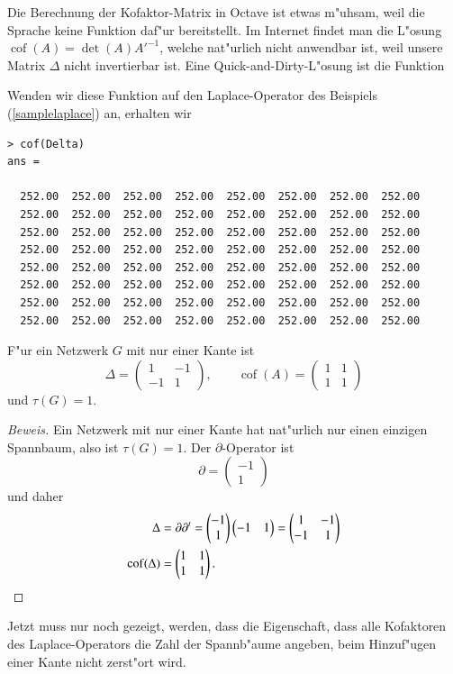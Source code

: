 \begin{beispiel}
Die Berechnung der Kofaktor-Matrix in Octave ist etwas m"uhsam, weil
die Sprache keine Funktion daf"ur bereitstellt.
Im Internet findet man die L"osung $\operatorname{cof}(A)=\det(A)A'^{-1}$,
welche nat"urlich nicht anwendbar ist, weil unsere Matrix $\Delta$
nicht invertierbar ist.
Eine Quick-and-Dirty-L"osung
ist die Funktion

Wenden wir diese Funktion auf den Laplace-Operator des Beispiels
(\ref{samplelaplace}) an, erhalten wir
{\small
\begin{verbatim}
> cof(Delta)
ans =

  252.00  252.00  252.00  252.00  252.00  252.00  252.00  252.00
  252.00  252.00  252.00  252.00  252.00  252.00  252.00  252.00
  252.00  252.00  252.00  252.00  252.00  252.00  252.00  252.00
  252.00  252.00  252.00  252.00  252.00  252.00  252.00  252.00
  252.00  252.00  252.00  252.00  252.00  252.00  252.00  252.00
  252.00  252.00  252.00  252.00  252.00  252.00  252.00  252.00
  252.00  252.00  252.00  252.00  252.00  252.00  252.00  252.00
  252.00  252.00  252.00  252.00  252.00  252.00  252.00  252.00
\end{verbatim}
}
\end{beispiel}

\begin{hilfssatz}
\label{matrixtreetheorem1}
F"ur ein Netzwerk $G$ mit nur einer Kante ist
\[
\Delta=\begin{pmatrix}
1&-1\\-1&1
\end{pmatrix},
\qquad
\operatorname{cof}(A)=\begin{pmatrix}1&1\\1&1\end{pmatrix}
\]
und
$\tau(G)=1$.
\end{hilfssatz}

\begin{proof}[Beweis]
Ein Netzwerk mit nur einer Kante hat nat"urlich nur einen einzigen
Spannbaum, also ist $\tau(G)=1$. Der $\partial$-Operator ist
\[
\partial=\begin{pmatrix}-1\\1\end{pmatrix}
\]
und daher
\begin{align*}
\Delta&=
\partial\partial^t=
\begin{pmatrix}-1\\1\end{pmatrix}
\begin{pmatrix}-1&1\end{pmatrix}
=
\begin{pmatrix}
1&-1\\
-1&1
\end{pmatrix}
\\
\operatorname{cof}(\Delta)&=\begin{pmatrix}1&1\\1&1\end{pmatrix}.
\qedhere
\end{align*}
\end{proof}
Jetzt muss nur noch gezeigt, werden, dass die Eigenschaft, dass alle
Kofaktoren des Laplace-Operators die Zahl der Spannb"aume angeben,
beim Hinzuf"ugen einer Kante nicht zerst"ort wird.

